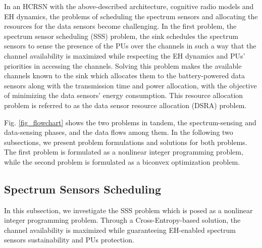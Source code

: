 \documentclass[journal]{IEEEtran} \ifCLASSINFOpdf
\begin{document}
In an HCRSN with the above-described architecture, cognitive radio models and EH dynamics, the problems of scheduling the spectrum sensors and allocating the resources for the data sensors become challenging. In the first problem, the spectrum sensor scheduling (SSS) problem, the sink schedules the spectrum sensors to sense the presence of the PUs over the channels in such a way that the channel availability is maximized while respecting the EH dynamics and PUs' priorities in accessing the channels. Solving this problem makes the available channels known to the sink which allocates them to the battery-powered data sensors along with the transmission time and power allocation, with the objective of minimizing the data sensors' energy consumption. This resource allocation problem is referred to as the data sensor resource allocation (DSRA) problem.


Fig. \ref{fig_flowchart} shows the two problems in tandem, the spectrum-sensing and data-sensing phases, and the data flows among them. In the following two subsections, we present problem formulations and solutions for both problems. The first problem is formulated as a nonlinear integer programming problem, while the second problem is formulated as a biconvex optimization problem.

\subsection{Spectrum Sensors Scheduling} \label{sec:spectrum_sensing}
In this subsection, we investigate the SSS problem which is posed as a nonlinear integer programming problem. Through a Cross-Entropy-based solution, the channel availability is maximized while guaranteeing EH-enabled spectrum sensors sustainability and PUs protection.
\end{document}
